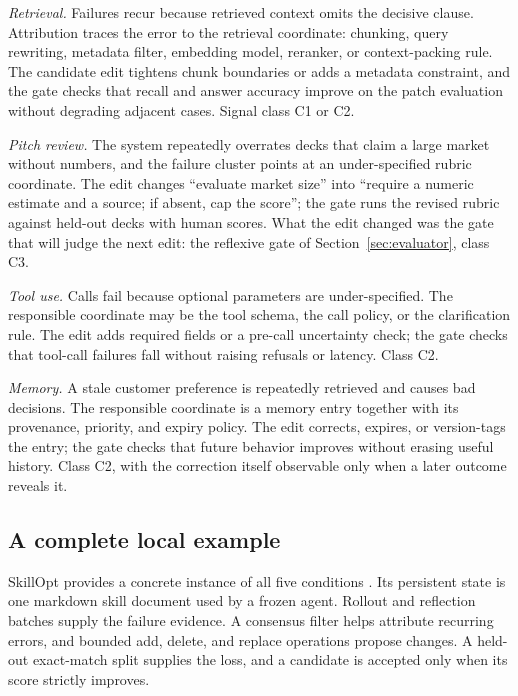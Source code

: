 \emph{Retrieval.} Failures recur because retrieved context omits the decisive clause. Attribution traces the error to the retrieval coordinate: chunking, query rewriting, metadata filter, embedding model, reranker, or context-packing rule. The candidate edit tightens chunk boundaries or adds a metadata constraint, and the gate checks that recall and answer accuracy improve on the patch evaluation without degrading adjacent cases. Signal class C1 or C2.

\emph{Pitch review.} The system repeatedly overrates decks that claim a large market without numbers, and the failure cluster points at an under-specified rubric coordinate. The edit changes ``evaluate market size'' into ``require a numeric estimate and a source; if absent, cap the score''; the gate runs the revised rubric against held-out decks with human scores. What the edit changed was the gate that will judge the next edit: the reflexive gate of Section~\ref{sec:evaluator}, class C3.

\emph{Tool use.} Calls fail because optional parameters are under-specified. The responsible coordinate may be the tool schema, the call policy, or the clarification rule. The edit adds required fields or a pre-call uncertainty check; the gate checks that tool-call failures fall without raising refusals or latency. Class C2.

\emph{Memory.} A stale customer preference is repeatedly retrieved and causes bad decisions. The responsible coordinate is a memory entry together with its provenance, priority, and expiry policy. The edit corrects, expires, or version-tags the entry; the gate checks that future behavior improves without erasing useful history. Class C2, with the correction itself observable only when a later outcome reveals it.

\subsection{A complete local example}\label{a-complete-local-example}

SkillOpt provides a concrete instance of all five conditions \citep{yang2026skillopt}. Its persistent state is one markdown skill document used by a frozen agent. Rollout and reflection batches supply the failure evidence. A consensus filter helps attribute recurring errors, and bounded add, delete, and replace operations propose changes. A held-out exact-match split supplies the loss, and a candidate is accepted only when its score strictly improves.

